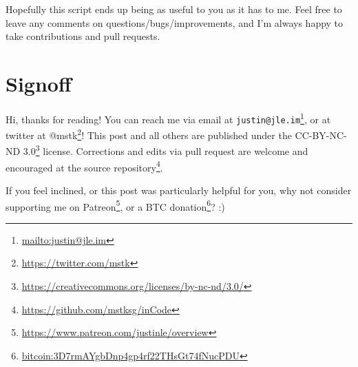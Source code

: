 \documentclass[]{article}
\renewcommand{\href}[2]{#2\footnote{\url{#1}}}
\begin{document}
Hopefully this script ends up being as useful to you as it has to me. Feel free
to leave any comments on questions/bugs/improvements, and I'm always happy to
take contributions and pull requests.

\hypertarget{signoff}{%
\section{Signoff}\label{signoff}}

Hi, thanks for reading! You can reach me via email at
\href{mailto:justin@jle.im}{\nolinkurl{justin@jle.im}}, or at twitter at
\href{https://twitter.com/mstk}{@mstk}! This post and all others are published
under the \href{https://creativecommons.org/licenses/by-nc-nd/3.0/}{CC-BY-NC-ND
3.0} license. Corrections and edits via pull request are welcome and encouraged
at \href{https://github.com/mstksg/inCode}{the source repository}.

If you feel inclined, or this post was particularly helpful for you, why not
consider \href{https://www.patreon.com/justinle/overview}{supporting me on
Patreon}, or a \href{bitcoin:3D7rmAYgbDnp4gp4rf22THsGt74fNucPDU}{BTC donation}?
:)
\end{document}
